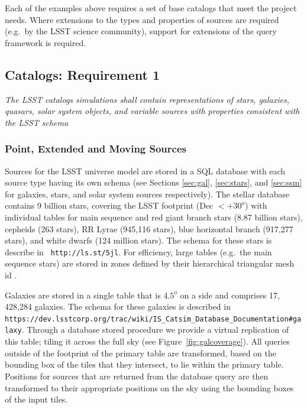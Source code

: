 \documentclass[11pt]{article}
\begin{document}
Each of the examples above requires a set of base catalogs that meet
the project needs.  Where extensions to the types and properties of
sources are required (e.g.\ by the LSST science community), support for
extensions of the query framework is required.

\subsection{Catalogs: Requirement 1}

{\it The LSST catalogs simulations shall contain representations of
  stars, galaxies, quasars, solar system objects, and variable sources
  with properties consistent with the LSST schema}\\

\subsubsection{Point, Extended and Moving Sources}

Sources for the LSST universe model are stored in a SQL database with
each source type having its own schema (see Sections \ref{sec:gal},
\ref{sec:stars}, and \ref{sec:ssm} for galaxies, stars, and solar
system sources respectively). The stellar database contains 9 billion
stars, covering the LSST footprint (Dec $< +30^o$) with individual
tables for main sequence and red giant branch stars (8.87 billion
stars), cepheids (263 stars), RR Lyrae (945,116 stars), blue
horizontal branch (917,277 stars), and white dwarfs (124 million
stars).  The schema for these stars is describe in {\tt
  http://ls.st/5jl}. For efficiency, large tables (e.g.\ the main
sequence stars) are stored in zones defined by their hierarchical
triangular mesh id \citep[HTM][]{htm}.

Galaxies are stored in a single table that is $4.5^o$ on a side and
comprises 17, 428,284 galaxies. The schema for these galaxies is
described in {\tt
  https://dev.lsstcorp.org/trac/wiki/IS\_Catsim\_Database\_Documentation\#galaxy}.
Through a database stored procedure we provide a virtual replication
of this table; tiling it across the full sky (see
Figure~\ref{fig:galcoverage}). All queries outside of the footprint of
the primary table are transformed, based on the bounding box of the
tiles that they intersect, to lie within the primary table. Positions
for sources that are returned from the database query are then
transformed to their appropriate positions on the sky using the
bounding boxes of the input tiles.
\end{document}

